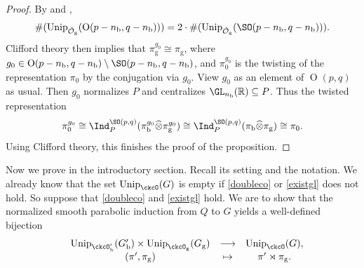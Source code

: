 \documentclass[11pt,a4paper]{amsart}
\newcommand{\CO}{{\mathcal {O}}}
\newcommand{\oO}{\operatorname{O}}
\newcommand{\R}{\mathbb R}
\numberwithin{equation}{section}
\theoremstyle{remark}
\def\Unip{\mathrm{Unip}}
\begin{document}
\begin{proof}
By  and \cite[Theorem 2.27]{BMSZa},
\[
\#(\Unip_{\check \CO_\mathrm g}(\oO(p-n_\mathrm b,q-n_\mathrm b)))=2 \cdot \#(\Unip_{\check \CO_\mathrm g}(\SO(p-n_\mathrm b,q-n_\mathrm b))).
\]
Clifford theory then implies that $\pi_\mathrm g^{g_0}\cong \pi_\mathrm g$, where $g_0\in \oO(p-n_\mathrm b,q-n_\mathrm b)\setminus \SO(p-n_\mathrm b,q-n_\mathrm b)$, and $\pi_0^{g_0}$ is the twisting of the representation $\pi_0$ by the conjugation via $g_0$. View $g_0$ as an element of $\oO(p,q)$ as usual. Then $g_0$ normalizes $P$ and centralizes $\GL_{n_\mathrm b}(\R)\subseteq P$. Thus
the twisted representation
\[
 \pi_0^{g_0}\cong \Ind_P^{\SO(p,q)}( \pi_\mathrm b^{g_0}\widehat \otimes \pi_\mathrm g^{g_0})\cong \Ind_P^{\SO(p,q)}( \pi_\mathrm b\widehat \otimes \pi_\mathrm g)\cong \pi_0.
\]
Using Clifford theory, this finishes the proof of the proposition.
\end{proof}

Now we prove  in the introductory section.  Recall its setting and the notation. We already know that the set $\Unip_{\ckcO }(G)$ is empty if \eqref{doubleco} or \eqref{existgl} does not hold.
 So suppose that  \eqref{doubleco} and \eqref{existgl} hold. We are to show that the normalized smooth parabolic induction from $Q$ to $G$ yields
   a well-defined bijection
   \[
    \begin{array}{rccc}
 &\Unip_{\ckcO'_{\mathrm b}}( G'_{\mathrm b}) \times   \Unip_{\ckcO_{\mathrm g}}( G_{\mathrm g})  &         \longrightarrow &\Unip_{\ckcO }(G), \\
                &   (\pi',\pi_\mathrm g) & \mapsto & \pi'\rtimes \pi_\mathrm g.
    \end{array}
 \]
\end{document}
